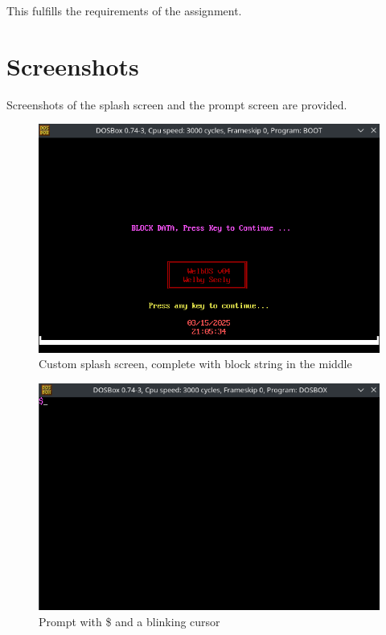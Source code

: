 \documentclass{article}
\begin{document}
    This fulfills the requirements of the assignment.


    \section{Screenshots}\label{sec:screenshots}
    Screenshots of the splash screen and the prompt screen are provided.

    \begin{figure}[H]  %
        \centering
        \includegraphics[width=\textwidth]{splash-screen} %
        \caption{Custom splash screen, complete with block string in the middle}
        \label{fig:1}
    \end{figure}

    \begin{figure}[H]  %
        \centering
        \includegraphics[width=\textwidth]{prompt} %
        \caption{Prompt with \$ and a blinking cursor}
        \label{fig:2}
    \end{figure}
\end{document}
